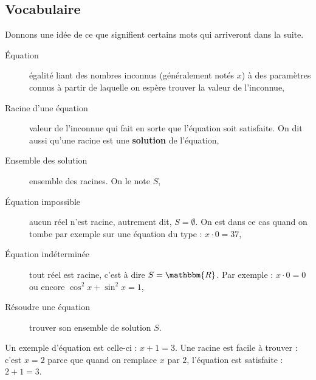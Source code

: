 \documentclass[a4paper,12pt]{book}
\newcommand{\eR}{\mathbbm{R}}
\theoremstyle{mes_exemples}	\newtheorem{exemple}[numtho]{Exemple}
\theoremstyle{mes_tho}
\newcommand{\defe}[2]{\textbf{#1}\index{#2}}
\begin{document}
\subsection{Vocabulaire}

Donnons une idée de ce que signifient certains mots qui arriveront dans la suite.
\begin{description}
\item[Équation] égalité liant des nombres inconnus (généralement notés $x$) à des paramètres connus à partir de laquelle on espère trouver la valeur de l'inconnue,
\item[Racine d'une équation] valeur de l'inconnue qui fait en sorte que l'équation soit satisfaite. On dit aussi qu'une racine est une \defe{solution}{} de l'équation,
\item[Ensemble des solution] ensemble des racines. On le note $S$,
\item[Équation impossible] aucun réel n'est racine, autrement dit, $S=\emptyset$. On est dans ce cas quand on tombe par exemple sur une équation du type : $x\cdot 0=37$,
\item[Équation indéterminée] tout réel est racine, c'est à dire $S=\eR$. Par exemple : $x\cdot 0=0$ ou encore $\cos^{2} x+\sin^{2}x=1$,
\item[Résoudre une équation] trouver son ensemble de solution $S$.
\end{description}

Un exemple d'équation est celle-ci : $x+1=3$. Une racine est facile à trouver : c'est $x=2$ parce que quand on remplace $x$ par $2$, l'équation est satisfaite : $2+1=3$.
\end{document}
